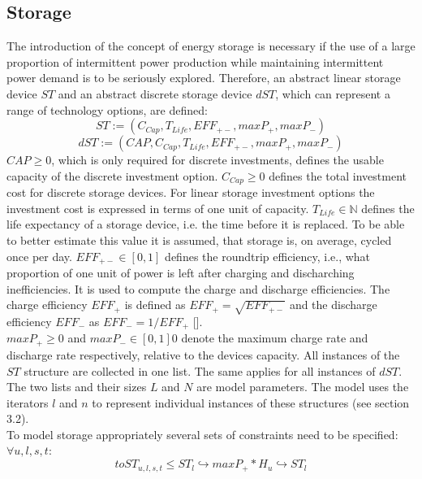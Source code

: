 \documentclass[
	11pt,								%
	DIV10,								%
	a4paper,         					%
	oneside,							%
	headheight=20pt,					%
	footheight=20pt,					%
    parskip=full,						%
    listof=totoc,						%
	bibliography=totoc,					%
	index=totoc,						%
]{scrartcl}
\begin{document}
\subsection{Storage}
The introduction of the concept of energy storage is necessary if the use of a large proportion of intermittent power production while maintaining intermittent power demand is to be seriously explored.
Therefore, an abstract linear storage device $ST$ and an abstract discrete storage device $dST$, which can represent a range of technology options, are defined:\\
	\begin{equation}
		ST := (C_{Cap}, T_{Life}, EFF_{+-}, maxP_{+}, maxP_{-})
	\end{equation}
	\begin{equation}
		dST := (CAP, C_{Cap}, T_{Life}, EFF_{+-}, maxP_{+}, maxP_{-})
	\end{equation}
	$CAP \geq 0$, which is only required for discrete investments, defines the usable capacity of the discrete investment option.
	$C_{Cap} \geq 0$ defines the total investment cost for discrete storage devices. For linear storage investment options the investment cost is expressed in terms of one unit of capacity.
	$T_{Life} \in \mathbb{N}$ defines the life expectancy of a storage device, i.e. the time before it is replaced. To be able to better estimate this value it is assumed, that storage is, on average, cycled once per day.
	$EFF_{+-} \in [0,1]$ defines the roundtrip efficiency, i.e., what proportion of one unit of power is left after charging and discharching inefficiencies. It is used to compute the charge and discharge efficiencies.
	The charge efficiency $EFF_{+}$ is defined as $EFF_{+} = \sqrt{EFF_{+-}}$ and the discharge efficiency $EFF_{-}$ as $EFF_{-} = 1/EFF_{+}$ [\cite{LAUINGER201624}].\\
	$maxP_{+} \geq 0$ and $maxP_{-} \in [0,1] 0$ denote the maximum charge rate and discharge rate respectively, relative to the devices capacity.
	All instances of the $ST$ structure are collected in one list. The same applies for all instances of $dST$. The two lists and their sizes $L$ and $N$ are model parameters. The model uses the iterators $l$ and $n$ to represent individual instances of these structures (see section 3.2).
	\\
	To model storage appropriately several sets of constraints need to be specified:
	\\
	$\forall u,l,s,t $:
	\begin{equation}
		toST_{u,l,s,t} \leq ST_l\hookrightarrow  maxP_{+} * H_u \hookrightarrow ST_l
	\end{equation}
\end{document}
